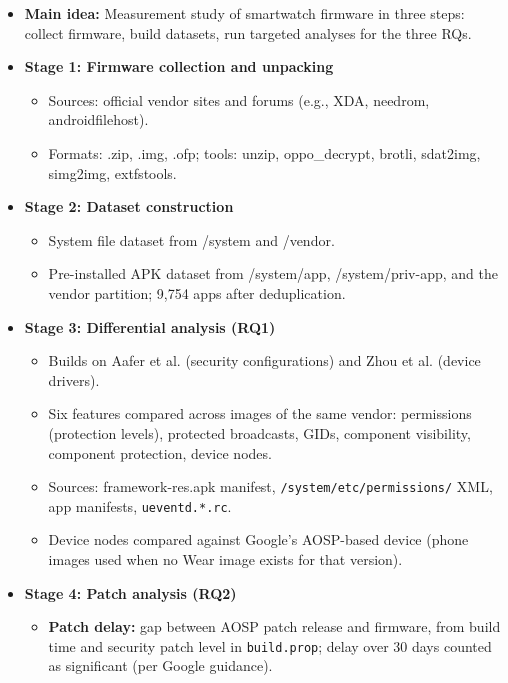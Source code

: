 \documentclass[11pt,a4paper]{article}
\begin{document}
\begin{enumerate}
    \begin{itemize}[leftmargin=*,itemsep=1pt,topsep=2pt]
        \item \textbf{Main idea:} Measurement study of smartwatch firmware in three steps: collect firmware, build datasets, run targeted analyses for the three RQs.
        \item \textbf{Stage 1: Firmware collection and unpacking}
        \begin{itemize}[itemsep=0pt]
            \item Sources: official vendor sites and forums (e.g., XDA, needrom, androidfilehost).
            \item Formats: .zip, .img, .ofp; tools: unzip, oppo\_decrypt, brotli, sdat2img, simg2img, extfstools.
        \end{itemize}
        \item \textbf{Stage 2: Dataset construction}
        \begin{itemize}[itemsep=0pt]
            \item System file dataset from /system and /vendor.
            \item Pre-installed APK dataset from /system/app, /system/priv-app, and the vendor partition; 9,754 apps after deduplication.
        \end{itemize}
        \item \textbf{Stage 3: Differential analysis (RQ1)}
        \begin{itemize}[itemsep=0pt]
            \item Builds on Aafer et al. (security configurations) and Zhou et al. (device drivers).
            \item Six features compared across images of the same vendor: permissions (protection levels), protected broadcasts, GIDs, component visibility, component protection, device nodes.
            \item Sources: framework-res.apk manifest, \texttt{/system/etc/permissions/} XML, app manifests, \texttt{ueventd.*.rc}.
            \item Device nodes compared against Google's AOSP-based device (phone images used when no Wear image exists for that version).
        \end{itemize}
        \item \textbf{Stage 4: Patch analysis (RQ2)}
        \begin{itemize}[itemsep=0pt]
            \item \textbf{Patch delay:} gap between AOSP patch release and firmware, from build time and security patch level in \texttt{build.prop}; delay over 30 days counted as significant (per Google guidance).

\end{itemize}
\end{itemize}
\end{enumerate}
\end{document}
